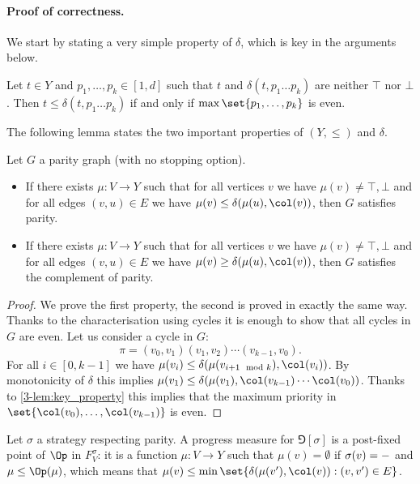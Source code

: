 \paragraph{\bf Proof of correctness.}
We start by stating a very simple property of $\delta$, which is key in the arguments below.

\begin{fact}
Let $t \in Y$ and $p_1,\dots,p_k \in [1,d]$ such that $t$ and $\delta(t,p_1 \dots p_k)$ are neither $\top$ nor $\bot$.
Then $t \le \delta(t,p_1 \dots p_k)$ if and only if $\max \set{p_1,\dots,p_k}$ is even.
\end{fact}

The following lemma states the two important properties of $(Y,\le)$ and $\delta$.

\begin{lemma}
\label{3-lem:key_property}
Let $G$ a parity graph (with no stopping option).
\begin{itemize}
	\item If there exists $\mu : V \to Y$ such that for all vertices $v$ we have $\mu(v) \neq \top,\bot$
	and for all edges $(v,u) \in E$ we have $\mu(v) \le \delta(\mu(u),\col(v))$,
	then $G$ satisfies parity.
	\item If there exists $\mu : V \to Y$ such that for all vertices $v$ we have $\mu(v) \neq \top,\bot$
	and for all edges $(v,u) \in E$ we have $\mu(v) \ge \delta(\mu(u),\col(v))$,
	then $G$ satisfies the complement of parity.
\end{itemize}
\end{lemma}
\begin{proof}
We prove the first property, the second is proved in exactly the same way.
Thanks to the characterisation using cycles it is enough to show that all cycles in $G$ are even.
Let us consider a cycle in $G$:
\[
\pi = (v_0,v_1) (v_1,v_2) \cdots (v_{k-1},v_0).
\]
For all $i \in [0,k-1]$ we have $\mu(v_i) \le \delta(\mu(v_{i+1 \mod k}),\col(v_i))$.
By monotonicity of $\delta$ this implies $\mu(v_1) \le \delta(\mu(v_1),\col(v_{k-1}) \cdots \col(v_0))$.
Thanks to \cref{3-lem:key_property} this implies that the maximum priority in $\set{\col(v_0),\dots,\col(v_{k-1})}$ is even.
\end{proof}

Let $\sigma$ a strategy respecting parity. 
A progress measure for $\Game[\sigma]$ is a post-fixed point of $\Op$ in $F^\sigma_V$:
it is a function $\mu : V \to Y$ such that $\mu(v) = \emptyset$ if $\sigma(v) = \mathtt{-}$ and $\mu \le \Op(\mu)$,
which means that $\mu(v) \le \min \set{ \delta(\mu(v'),\col(v)) : (v,v') \in E}$.

